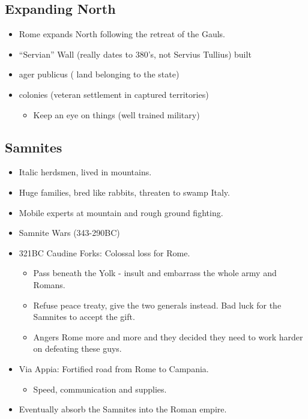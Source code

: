 \documentclass[12pt, twoside]{article}
\begin{document}
\subsection{Expanding North}
\begin{itemize}
\item Rome expands North following the retreat of the Gauls.
\item “Servian” Wall (really dates to 380's, not Servius Tullius) built
\item ager publicus ( land belonging to the state)
\item colonies (veteran settlement in captured territories)
	\begin{itemize}
	\item Keep an eye on things (well trained military)
	\end{itemize}
\end{itemize}

\subsection{Samnites}
\begin{itemize}
\item Italic herdsmen, lived in mountains.
\item Huge families, bred like rabbits, threaten to swamp Italy.
\item Mobile experts at mountain and rough ground fighting.
\item Samnite Wars (343-290BC)
\item 321BC Caudine Forks: Colossal loss for Rome.
	\begin{itemize}
	\item Pass beneath the Yolk - insult and embarrass the whole army and Romans.
	\item Refuse peace treaty, give the two generals instead.  Bad luck for the Samnites to accept the gift.
	\item Angers Rome more and more and they decided they need to work harder on defeating these guys.
	\end{itemize} 
\item Via Appia: Fortified road from Rome to Campania.
	\begin{itemize}
	\item Speed, communication and supplies.
	\end{itemize}
\item Eventually absorb the Samnites into the Roman empire.
\end{itemize}
\end{document}
